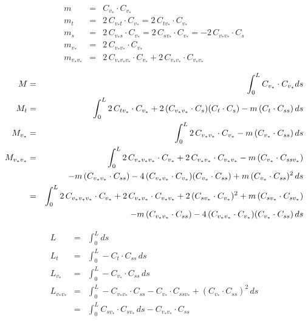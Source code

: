 \documentclass[twoside,a4paper,english]{article}
\def\v{{v_*}}
\begin{document}
\begin{eqnarray}
  m        &=& C_{\v}\cdot C_{\v}
  \\
  m_t      &=& 2\,C_{\v t}\cdot C_{\v} = 2\,C_{t\v}\cdot C_{\v}
  \\
  m_s      &=& 2\,C_{\v s}\cdot C_{\v}= 2\,C_{s\v}\cdot C_{\v}
                                      =-2\,C_{\v\v}\cdot C_s
  \\
  m_{\v}   &=& 2\,C_{\v\v}\cdot C_{\v}
  \\
  m_{\v\v} &=& 2\,C_{\v\v\v}\cdot C_{\v}+2\,C_{\v\v}\cdot C_{\v\v}
\end{eqnarray}

\begin{eqnarray}
  M        &=& \int_0^L C_{\v}\cdot C_{\v} ds
  \\
  M_t      &=& \int_0^L 2\,C_{t\v}\cdot C_{\v}
                      + 2\,(C_{\v\v}\cdot C_s)(C_t\cdot C_s)
                      - m\,(C_t\cdot C_{ss})\,ds
  \\
  M_{\v}   &=& \int_0^L 2\,C_{\v\v}\cdot C_{\v} - m\,(C_{\v}\cdot C_{ss})\,ds
  \\
  M_{\v\v} &=& \int_0^L 2\,C_{\v\v\v}\cdot C_{\v}
                       +2\,C_{\v\v}\cdot C_{\v\v}
                       -m\,(C_{\v}\cdot C_{ss\v})
  \\ && \hspace{5mm} \nonumber
                       -m\,(C_{\v\v}\cdot C_{ss})
                       -4\,(C_{\v\v}\cdot C_{\v})(C_{\v}\cdot C_{ss})
                       +m\,(C_{\v}\cdot C_{ss})^2
               \,ds
  \\ \nonumber
           &=& \int_0^L 2\,C_{\v\v\v}\cdot C_{\v}
                       +2\,C_{\v\v}\cdot C_{\v\v}
                       +2\,(C_{s\v}\cdot C_{\v})^2
                       +m\,(C_{s\v}\cdot C_{s\v})
  \\ && \hspace{5mm} \nonumber
                       -m\,(C_{\v\v}\cdot C_{ss})
                       -4\,(C_{\v\v}\cdot C_{\v})(C_{\v}\cdot C_{ss})
               \,ds
\end{eqnarray}

\begin{eqnarray}
  L        &=& \int_0^L ds
  \\
  L_t      &=& \int_0^L -C_t\cdot C_{ss}\,ds
  \\
  L_{\v}   &=& \int_0^L -C_{\v}\cdot C_{ss}\,ds
  \\
  L_{\v\v} &=& \int_0^L -C_{\v\v}\cdot C_{ss} - C_{\v}\cdot C_{ss\v}
                       +(C_{\v}\cdot C_{ss})^2\,ds
  \\ \nonumber
           &=& \int_0^L C_{s\v}\cdot C_{s\v}\,ds - C_{\v\v}\cdot C_{ss}
\end{eqnarray}
\end{document}
